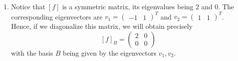 \begin{solution}
\begin{enumerate}[1)]
    \item 
    Notice that \([f]\) is a symmetric matrix, its eigenvalues being \(2\) and \(0\). The corresponding eigenvectors are \(v_1 = \begin{pmatrix}-1 & 1\end{pmatrix}^T\) and \(v_2 = \begin{pmatrix}1 & 1\end{pmatrix}^T\). Hence, if we diagonalize this matrix, we will obtain precisely
    \[
        [f]_B = \begin{pmatrix}
            2 & 0 \\
            0 & 0
        \end{pmatrix}
    \]
    with the basis \(B\) being given by the eigenvectors \(v_1, v_2\).
\end{enumerate}
\end{solution}
